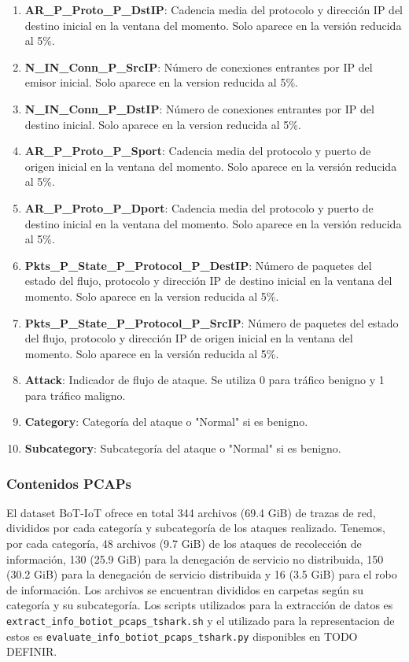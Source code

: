 \begin{enumerate}
    \item \textbf{AR\_P\_Proto\_P\_DstIP}: Cadencia media del protocolo y dirección IP del destino inicial en la ventana del momento. Solo aparece en la versión reducida al 5\%.
    \item \textbf{N\_IN\_Conn\_P\_SrcIP}: Número de conexiones entrantes por IP del emisor inicial. Solo aparece en la version reducida al 5\%.
    \item \textbf{N\_IN\_Conn\_P\_DstIP}: Número de conexiones entrantes por IP del destino inicial. Solo aparece en la version reducida al 5\%.
    \item \textbf{AR\_P\_Proto\_P\_Sport}: Cadencia media del protocolo y puerto  de origen inicial en la ventana del momento. Solo aparece en la versión reducida al 5\%.
    \item \textbf{AR\_P\_Proto\_P\_Dport}: Cadencia media del protocolo y puerto  de destino inicial en la ventana del momento. Solo aparece en la versión reducida al 5\%.
    \item \textbf{Pkts\_P\_State\_P\_Protocol\_P\_DestIP}: Número de paquetes del estado del flujo, protocolo y dirección IP de destino inicial en la ventana del momento. Solo aparece en la version reducida al 5\%.
    \item \textbf{Pkts\_P\_State\_P\_Protocol\_P\_SrcIP}: Número de paquetes del estado del flujo, protocolo y dirección IP de origen inicial en la ventana del momento. Solo aparece en la versión reducida al 5\%.
    \item \textbf{Attack}: Indicador de flujo de ataque. Se utiliza 0 para tráfico benigno y 1 para tráfico maligno.
    \item \textbf{Category}: Categoría del ataque o "Normal" si es benigno.
    \item \textbf{Subcategory}: Subcategoría del ataque o "Normal" si es benigno.
\end{enumerate}


\subsubsection{Contenidos PCAPs}

El dataset BoT-IoT ofrece en total 344 archivos (69.4 GiB) de trazas de red, divididos por cada categoría y subcategoría de los ataques realizado. Tenemos, por cada categoría, 48 archivos (9.7 GiB) de los ataques de recolección de información, 130 (25.9 GiB) para la denegación de servicio no distribuida, 150 (30.2 GiB) para la denegación de servicio distribuida y 16 (3.5 GiB) para el robo de información. Los archivos se encuentran divididos en carpetas según su categoría y su subcategoría. Los scripts utilizados para la extracción de datos es \texttt{extract\_info\_botiot\_pcaps\_tshark.sh} y el utilizado para la representacion de estos es \texttt{evaluate\_info\_botiot\_pcaps\_tshark.py} disponibles en TODO DEFINIR.

